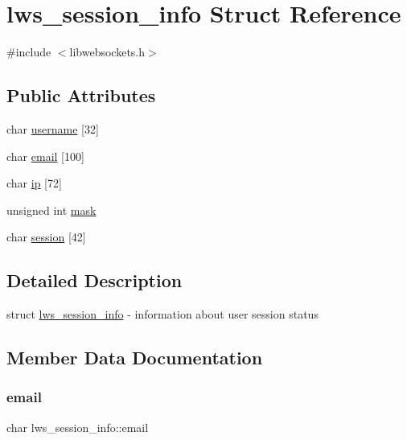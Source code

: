 \hypertarget{structlws__session__info}{}\section{lws\+\_\+session\+\_\+info Struct Reference}
\label{structlws__session__info}


{\ttfamily \#include $<$libwebsockets.\+h$>$}

\subsection*{Public Attributes}
\begin{DoxyCompactItemize}
\item 
char \hyperlink{structlws__session__info_ac7f23c974e8ede87d477b1d0a88587f0}{username} \mbox{[}32\mbox{]}
\item 
char \hyperlink{structlws__session__info_adcbf2c8ecfacad3882aceef200c738f4}{email} \mbox{[}100\mbox{]}
\item 
char \hyperlink{structlws__session__info_ae1025a6b22e5628f55c8c1b495b54bb8}{ip} \mbox{[}72\mbox{]}
\item 
unsigned int \hyperlink{structlws__session__info_afb924864b70f40372920688a5c1c895e}{mask}
\item 
char \hyperlink{structlws__session__info_ac6b5a5a4d7d346603097f37144df03e3}{session} \mbox{[}42\mbox{]}
\end{DoxyCompactItemize}


\subsection{Detailed Description}
struct \hyperlink{structlws__session__info}{lws\+\_\+session\+\_\+info} -\/ information about user session status 

\subsection{Member Data Documentation}
\mbox{\label{structlws__session__info_adcbf2c8ecfacad3882aceef200c738f4}} 
\subsubsection{\texorpdfstring{email}{email}}
{\footnotesize\ttfamily char lws\+\_\+session\+\_\+info\+::email}

